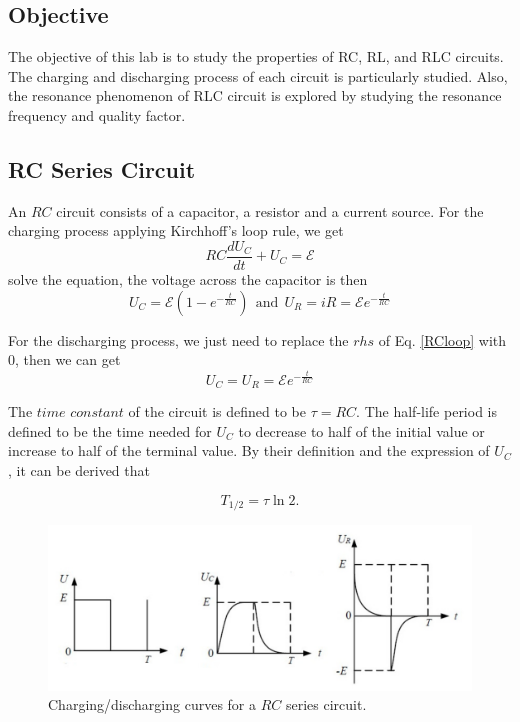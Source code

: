 \documentclass{article}
\begin{document}
	\subsection{Objective}
The objective of this lab is to study the properties of RC, RL, and RLC circuits. The charging and discharging process of each circuit is particularly studied. Also, the resonance phenomenon of RLC circuit is explored by studying the resonance frequency and quality factor.
	\subsection{RC Series Circuit}	
An $RC$ circuit consists of a capacitor, a resistor and a current source. For the charging process applying Kirchhoff’s loop rule, we get
\begin{equation}\label{RCloop}
RC\frac{dU_C}{dt}+U_C=\mathcal{E}
\end{equation}
solve the equation, the voltage across the capacitor is then
$$U_C = \mathcal{E}(1-e^{-\frac{t}{RC}})~~\text{and}~~U_R = iR = \mathcal{E}e^{-\frac{t}{RC}}$$

For the discharging process, we just need to replace the $rhs$ of Eq. \eqref{RCloop} with 0, then we can get $$U_C = U_R = \mathcal{E}e^{-\frac{t}{RC}}$$

The $\textit{time constant}$ of the circuit is defined to be $\tau = RC$. The half-life period is defined to be the time needed for $U_C$ to decrease to half of the initial value or increase to half of the terminal value. By their definition and the expression of $U_C$, it can be derived that

\begin{equation}
    T_{1/2} = \tau\ln 2.
    \label{eq:ThalfRC}
\end{equation}


\begin{figure}[H]
\centering
\includegraphics[scale=0.5]{RC}
\caption{Charging/discharging curves for a $RC$ series circuit.}
\end{figure}
\end{document}
